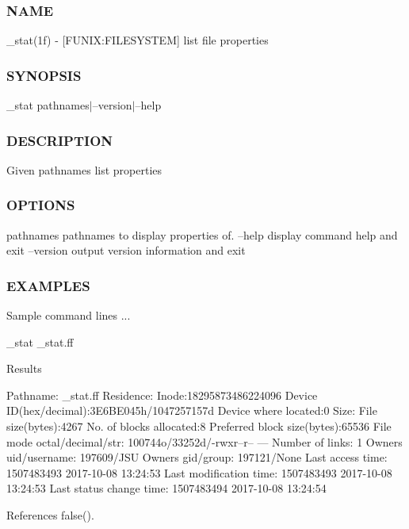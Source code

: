 \subsubsection*{N\+A\+ME}

\+\_\+stat(1f) -\/ \mbox{[}F\+U\+N\+IX\+:F\+I\+L\+E\+S\+Y\+S\+T\+EM\mbox{]} list file properties \subsubsection*{S\+Y\+N\+O\+P\+S\+IS}

\+\_\+stat pathnames$\vert$--version$\vert$--help \subsubsection*{D\+E\+S\+C\+R\+I\+P\+T\+I\+ON}

Given pathnames list properties \subsubsection*{O\+P\+T\+I\+O\+NS}

pathnames pathnames to display properties of. --help display command help and exit --version output version information and exit \subsubsection*{E\+X\+A\+M\+P\+L\+ES}

Sample command lines ...

\+\_\+stat \+\_\+stat.\+ff

Results

Pathname\+: \+\_\+stat.\+ff Residence\+: Inode\+:18295873486224096 Device ID(hex/decimal)\+:3\+E6\+B\+E045h/1047257157d Device where located\+:0 Size\+: File size(bytes)\+:4267 No. of blocks allocated\+:8 Preferred block size(bytes)\+:65536 File mode octal/decimal/str\+: 100744o/33252d/-\/rwxr--r-- --- Number of links\+: 1 Owner\textquotesingle{}s uid/username\+: 197609/\+J\+SU Owner\textquotesingle{}s gid/group\+: 197121/\+None Last access time\+: 1507483493 2017-\/10-\/08 13\+:24\+:53 Last modification time\+: 1507483493 2017-\/10-\/08 13\+:24\+:53 Last status change time\+: 1507483494 2017-\/10-\/08 13\+:24\+:54 

References false().

\mbox{\label{__stat_8f90_a9ea6ab9cdaa05a5fc3ac6e5448b11c68}} 
